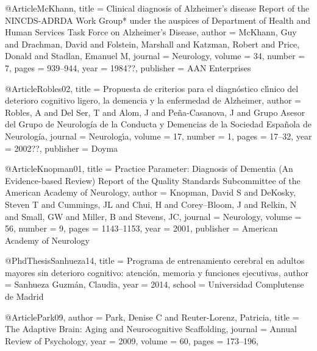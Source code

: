 @Article{McKhann,
    title   = {{Clinical diagnosis of Alzheimer's disease Report of the NINCDS-ADRDA Work Group* 
               under the auspices of Department of Health and Human Services Task Force on 
               Alzheimer's Disease}},
    author  = {McKhann, Guy 
               and Drachman, David 
               and Folstein, Marshall 
               and Katzman, Robert 
               and Price, Donald 
               and Stadlan, Emanuel M},
    journal = {Neurology},
    volume  = {34},
    number  = {7},
    pages   = {939--944},
    year    = {1984??},
    publisher = {{AAN Enterprises}}
}

@Article{Robles02,
    title     = {Propuesta de criterios para el diagn{\'o}stico cl{\'\i}nico del deterioro 
                cognitivo ligero, la demencia y la enfermedad de {A}lzheimer},
    author    = {Robles, A 
                 and Del Ser, T
                 and Alom, J
                 and Pe{\~n}a-Casanova, J
                 and {G}rupo {A}sesor del {G}rupo de {N}eurolog{í}a de la {C}onducta y {D}emencias
                     de la {S}ociedad {E}spa{ñ}ola de {N}eurolog{í}a},
    journal   = {Neurolog{\'\i}a},
    volume    = {17},
    number    = {1},
    pages     = {17--32},
    year      = {2002??},
    publisher = {Doyma}
}

@Article{Knopman01,
    title   = {Practice {P}arameter: {D}iagnosis of {D}ementia ({A}n {E}vidence-based {R}eview) 
               {R}eport of the {Q}uality {S}tandards {S}ubcommittee of the {A}merican {A}cademy of 
               {N}eurology},
    author  = {Knopman, David S 
               and DeKosky, Steven T 
               and Cummings, JL 
               and Chui, H 
               and Corey--Bloom, J 
               and Relkin, N 
               and Small, GW 
               and Miller, B 
               and Stevens, JC},
    journal = {Neurology},
    volume  = {56},
    number  = {9},
    pages   = {1143--1153},
    year    = {2001},
    publisher = {American {A}cademy of {N}eurology}
}

@PhdThesis{Sanhueza14,
    title  = {Programa de entrenamiento cerebral en adultos mayores sin deterioro cognitivo: 
              atenci{\'o}n, memoria y funciones ejecutivas},
    author = {Sanhueza Guzm{\'a}n, Claudia},
    year   = {2014},
    school = {Universidad Complutense de Madrid}
}

@Article{Park09,
    author  = {Park, Denise C 
               and Reuter-Lorenz, Patricia},
    title   = {The {A}daptive {B}rain: {A}ging and {N}eurocognitive {S}caffolding},
    journal = {Annual {R}eview of {P}sychology},
    year    = {2009},
    volume  = {60},
    pages   = {173--196},
}

